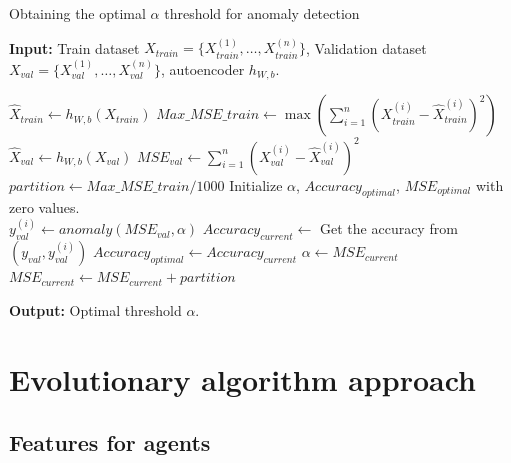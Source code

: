 \documentclass{iosart2c}
\begin{document}
\begin{algorithm*}
\caption{Obtaining the optimal $\alpha$ threshold for anomaly detection}\label{obtener_umbral}
\textbf{Input:} Train dataset $X_{train}=\{X_{train}^{(1)},\ldots,X_{train}^{(n)}\}$, Validation dataset $X_{val}=\{X_{val}^{(1)},\ldots,X_{val}^{(n)}\}$, autoencoder $h_{W,b}$.\\

\begin{algorithmic}
\State $\hat{X}_{train} \xleftarrow{} h_{W,b}(X_{train})$ 
\State $Max\_MSE\_{train}\xleftarrow{}\max\left(\sum_{i=1}^n\left(X_{train}^{(i)}-\hat{X}_{train}^{(i)}\right)^2\right)$ 
\State $\hat{X}_{val} \xleftarrow{} h_{W,b}(X_{val})$ 
\State $MSE_{val}\xleftarrow{}\sum_{i=1}^n\left(X_{val}^{(i)}-\hat{X}_{val}^{(i)}\right)^2$ 
\State $partition\xleftarrow{} Max\_MSE\_{train}/1000$
\State Initialize $\alpha$, $Accuracy_{optimal}$, $MSE_{optimal}$ with zero values.\\



 
    \State $y_{val}^{(i)}\xleftarrow{}anomaly(MSE_{val},\alpha)$
    \State $Accuracy_{current}\xleftarrow{}$ Get the accuracy from $(y_{val},y_{val}^{(i)})$
            \State $Accuracy_{optimal}\xleftarrow{}Accuracy_{current}$
            \State $\alpha\xleftarrow{}MSE_{current}$
        \EndIf
    \State $MSE_{current}\xleftarrow{}MSE_{current}+partition$
\EndFor\\
\end{algorithmic}
\textbf{Output:} Optimal threshold $\alpha$.\\
\end{algorithm*}


\newpage



\section{Evolutionary algorithm approach}

\subsection{Features for agents}\label{variables}
\end{document}
